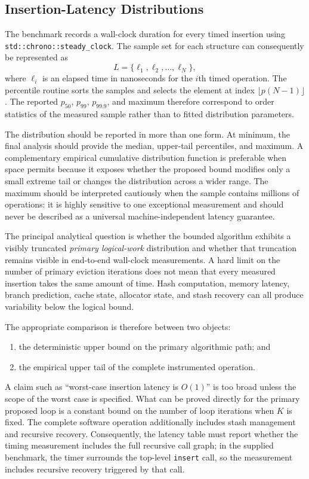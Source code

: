 \documentclass[conference]{IEEEtran}
\begin{document}
\subsection{Insertion-Latency Distributions}
\label{subsec:latency_distributions}

The benchmark records a wall-clock duration for every timed insertion using \texttt{std::chrono::steady\_clock}. The sample set for each structure can consequently be represented as
\begin{equation}
L = \{\ell_1,\ell_2,\ldots,\ell_N\},
\end{equation}
where $\ell_i$ is an elapsed time in nanoseconds for the $i$th timed operation. The percentile routine sorts the samples and selects the element at index $\lfloor p(N-1)\rfloor$. The reported $p_{50}$, $p_{99}$, $p_{99.9}$, and maximum therefore correspond to order statistics of the measured sample rather than to fitted distribution parameters.

The distribution should be reported in more than one form. At minimum, the final analysis should provide the median, upper-tail percentiles, and maximum. A complementary empirical cumulative distribution function is preferable when space permits because it exposes whether the proposed bound modifies only a small extreme tail or changes the distribution across a wider range. The maximum should be interpreted cautiously when the sample contains millions of operations: it is highly sensitive to one exceptional measurement and should never be described as a universal machine-independent latency guarantee.

The principal analytical question is whether the bounded algorithm exhibits a visibly truncated \emph{primary logical-work} distribution and whether that truncation remains visible in end-to-end wall-clock measurements. A hard limit on the number of primary eviction iterations does not mean that every measured insertion takes the same amount of time. Hash computation, memory latency, branch prediction, cache state, allocator state, and stash recovery can all produce variability below the logical bound.

The appropriate comparison is therefore between two objects:
\begin{enumerate}
\item the deterministic upper bound on the primary algorithmic path; and
\item the empirical upper tail of the complete instrumented operation.
\end{enumerate}
A claim such as ``worst-case insertion latency is $O(1)$'' is too broad unless the scope of the worst case is specified. What can be proved directly for the primary proposed loop is a constant bound on the number of loop iterations when $K$ is fixed. The complete software operation additionally includes stash management and recursive recovery. Consequently, the latency table must report whether the timing measurement includes the full recursive call graph; in the supplied benchmark, the timer surrounds the top-level \texttt{insert} call, so the measurement includes recursive recovery triggered by that call.
\end{document}

